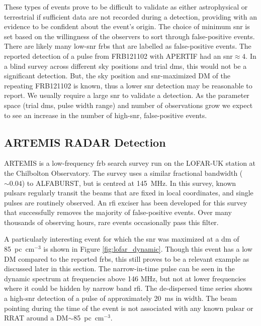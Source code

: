 \documentclass[a4paper,fleqn,usenatbib]{mnras}
\begin{document}
These types of events prove to be difficult to validate as either astrophysical or
terrestrial if sufficient data are not recorded during a detection, providing with an 
evidence to be confident about the event's origin. The choice of minimum \gls{snr} is set
based on the willingness of the observers to sort through false-positive events.
There are likely many low-\gls{snr} \glspl{frb} that are labelled as
false-positive events.  The reported detection of a pulse from FRB121102 with
APERTIF \citep{atel10693} had an \gls{snr}$\approx 4$. In a blind survey across
different sky positions and trial \glspl{dm}, this would not be a significant detection.
But, the sky position and \gls{snr}-maximized DM of the repeating FRB121102 is
known, thus a lower \gls{snr} detection may be reasonable to report.  We usually require
a large \gls{snr} to validate a detection.  As the parameter space (trial \glspl{dm},
pulse width range) and number of observations grow we expect to see an increase
in the number of high-\gls{snr}, false-positive events.

\subsection{ARTEMIS RADAR Detection}
\label{sec:LOFAR_RADAR}

ARTEMIS \citep{2015MNRAS.452.1254K} is a low-frequency \gls{frb} search survey
run on the LOFAR-UK station at the Chilbolton Observatory.  The survey uses a
similar fractional bandwidth ($\sim 0.04$) to ALFABURST, but is centred at
145~MHz.  In this survey, known pulsars regularly transit the beams that are
fixed in local coordinates, and single pulses are routinely observed.  An
\gls{rfi} exciser has been developed for this survey that successfully removes
the majority of false-positive events. Over many thousands of observing hours,
rare events occasionally pass this filter.

A particularly interesting event for which the \gls{snr} was maximized at a
\gls{dm} of 85~pc~cm$^{-3}$ is shown in Figure \ref{fig:lofar_dynamic}. Though
this event has a low DM compared to the reported \glspl{frb}, this still proves to be a
relevant example as discussed later in this section.  The narrow-in-time pulse
can be seen in the dynamic spectrum at frequencies above 146 MHz, but not at
lower frequencies where it could be hidden by narrow band \gls{rfi}.  The
de-dispersed time series shows a high-\gls{snr} detection of a pulse of
approximately 20~ms in width.  The beam pointing during the time of the event is
not associated with any known pulsar or RRAT around a DM$\sim$85~pc~cm$^{-3}$.
\end{document}
